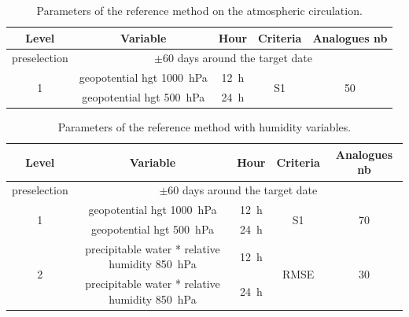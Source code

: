 \documentclass{ametsoc}
\begin{document}
\begin{table}[htbp]
	\footnotesize
	\caption{Parameters of the reference method on the atmospheric circulation.}
	\begin{center}
		\begin{tabular}{ccccc}
			\hline \textbf{Level} & \textbf{Variable} & \textbf{Hour} & \textbf{Criteria} & \textbf{Analogues nb} \\ 
			\hline 
			preselection & \multicolumn{4}{c}{$\pm 60$ days around the target date} \\
			\hline 
			\multirow{2}{*}{1} & geopotential hgt 1000~hPa & 12~h & \multirow{2}{*}{S1} & \multirow{2}{*}{50} \\
			& geopotential hgt 500~hPa & 24~h & & \\ 
			\hline 
		\end{tabular} 
	\end{center}
	\label{table_params_R1}
\end{table}


\begin{table}[htbp]
	\footnotesize
	\caption{Parameters of the reference method with humidity variables.}
	\begin{center}
		\begin{tabular}{ccccc}
			\hline \textbf{Level} & \textbf{Variable} & \textbf{Hour} & \textbf{Criteria} & \textbf{Analogues nb} \\ 
			\hline 
			preselection & \multicolumn{4}{c}{$\pm 60$ days around the target date} \\
			\hline 
			\multirow{2}{*}{1} & geopotential hgt 1000~hPa & 12~h & \multirow{2}{*}{S1} & \multirow{2}{*}{70} \\
			& geopotential hgt 500~hPa & 24~h & & \\ 
			\hline
			\multirow{2}{*}{2} & precipitable water * relative humidity 850~hPa & 12~h & \multirow{2}{*}{RMSE} & \multirow{2}{*}{30} \\
			& precipitable water * relative humidity 850~hPa & 24~h & & \\ 
			\hline 
		\end{tabular} 
	\end{center}
	\label{table_params_R2}
\end{table}


%
\end{document}
